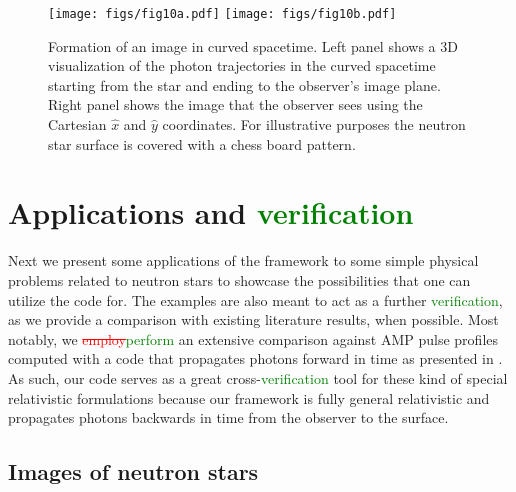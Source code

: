 \documentclass{aa}
\newcommand{\refe}[1]{\textcolor{green}{{#1}}}
\newcommand{\refedel}[1]{\textcolor{red}{\sout{#1}}}
\newcommand{\lgamma}{\gamma_{\text{L}}}
\begin{document}
\begin{figure}
\centering
\texttt{[image: figs/fig10a.pdf]}
\texttt{[image: figs/fig10b.pdf]}
\caption{\label{fig:image}
  Formation of an image in curved spacetime.
  Left panel shows a 3D visualization of the photon trajectories in the curved spacetime starting from the star and ending to the observer's image plane.
  Right panel shows the image that the observer sees using the Cartesian $\hat{x}$ and $\hat{y}$ coordinates.
  For illustrative purposes the neutron star surface is covered with a chess board pattern.
  }
\end{figure}


\section{Applications and \refe{verification}}\label{sect:appl}

Next we present some applications of the framework to some simple physical problems related to neutron stars to showcase the possibilities that one can utilize the code for.
The examples are also meant to act as a further \refe{verification}, as we provide a comparison with existing literature results, when possible.
Most notably, we \refedel{employ}\refe{perform} an extensive comparison against AMP pulse profiles computed with a code that propagates photons forward in time as presented in \citet{PB06}.
As such, our code serves as a great cross-\refe{verification} tool for these kind of special relativistic formulations because our framework is fully general relativistic and propagates photons backwards in time from the observer to the surface.




\subsection{Images of neutron stars}
\end{document}
